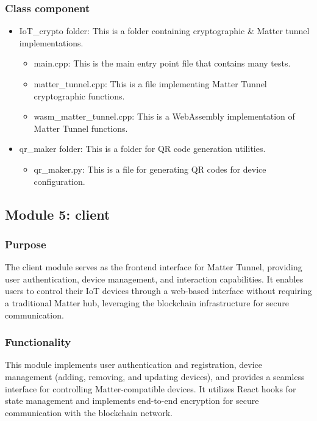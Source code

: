 \documentclass[conference]{IEEEtran}
\begin{document}
\subsubsection{Class component}
\begin{itemize}
	\item IoT\_crypto folder: This is a folder containing cryptographic \& Matter tunnel implementations.
	      \begin{itemize}
	      	\item main.cpp: This is the main entry point file that contains many tests.
	      	\item matter\_tunnel.cpp: This is a file implementing Matter Tunnel cryptographic functions.
	      	\item wasm\_matter\_tunnel.cpp: This is a WebAssembly implementation of Matter Tunnel functions.
	      \end{itemize}
	\item qr\_maker folder: This is a folder for QR code generation utilities.
	      \begin{itemize}
	      	\item qr\_maker.py: This is a file for generating QR codes for device configuration.
	      \end{itemize}
\end{itemize}

\subsection{Module 5: client}

\subsubsection{Purpose}
The client module serves as the frontend interface for Matter Tunnel, providing user authentication, device management, and interaction capabilities. It enables users to control their IoT devices through a web-based interface without requiring a traditional Matter hub, leveraging the blockchain infrastructure for secure communication.

\subsubsection{Functionality}
This module implements user authentication and registration, device management (adding, removing, and updating devices), and provides a seamless interface for controlling Matter-compatible devices. It utilizes React hooks for state management and implements end-to-end encryption for secure communication with the blockchain network.
\end{document}
